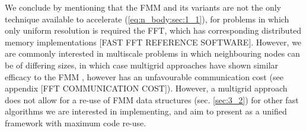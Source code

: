 We conclude by mentioning that the \gls{FMM} and its variants are not the only technique available to accelerate (\ref{eq:n_body:sec:1_1}), for problems in which only uniform resolution is required the \gls{FFT}, which has corresponding distributed memory implementations [FAST FFT REFERENCE SOFTWARE]. However, we are commonly interested in multiscale problems in which neighbouring nodes can be of differing sizes, in which case multigrid approaches have shown similar efficacy to the FMM \cite{gholami2016fft}, however has an unfavourable communication cost (see appendix [FFT COMMUNICATION COST]). However, a multigrid approach does not allow for a re-use of FMM data structures (sec. \ref{sec:3_2}) for other fast algorithms we are interested in implementing, and aim to present as a unified framework with maximum code re-use.

